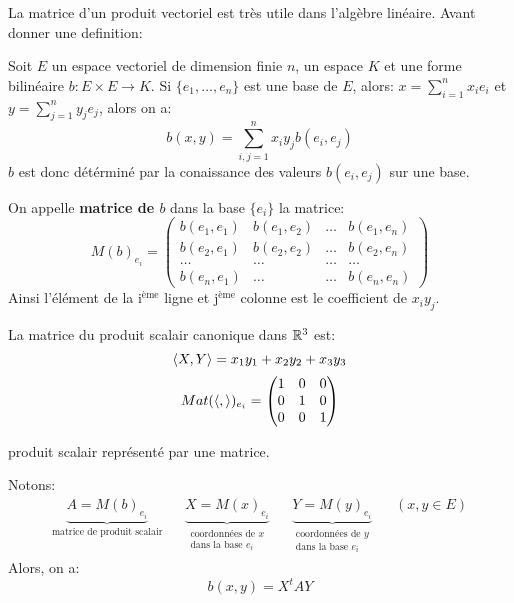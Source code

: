 La matrice d'un produit vectoriel est très utile dans l'algèbre linéaire. Avant donner une definition:
\par
Soit $E$ un espace vectoriel de dimension finie  $n$, un espace  $K$ et une forme bilinéaire  $b: E \times E \longrightarrow K$. Si $\{e_1, \ldots, e_n\}$ est une base de $E$, alors:  $x = \sum_{i=1}^{n} x_ie_i$ et $y = \sum_{j=1}^{n} y_je_j$, alors on a:
\[
b(x, y) = \sum_{i,j = 1}^{n} x_iy_jb(e_i, e_j)
\] 
$b$ est donc détérminé par la conaissance des valeurs  $b(e_i, e_j)$ sur une base.
 \begin{definition}
     On appelle  \textbf{matrice de $b$} dans la base $\{e_i\}$ la matrice:
      \[
          M(b)_{e_i} = \begin{pmatrix} 
              b(e_1, e_1) & b(e_1, e_2) & \ldots & b(e_1, e_n)\\
              b(e_2, e_1) & b(e_2, e_2) & \ldots & b(e_2, e_n)\\
              \ldots & \ldots & \ldots & \ldots\\
              b(e_n, e_1) & \ldots & \ldots & b(e_n, e_n)
          \end{pmatrix} 
     \] 
     Ainsi l'élément de la $\text{i}^{\text{ème}}$ ligne et $\text{j}^{\text{ème}}$ colonne est le coefficient de $x_iy_j$.
\end{definition}
\begin{eg}
   La matrice du produit scalair canonique dans $\mathbb{R}^3$ est:
   \[
       \left\langle X, Y \right\rangle = x_1y_1 + x_2y_2 + x_3y_3 
   \] 
   \[
       Mat(\left\langle , \right\rangle)_{e_i} = \begin{pmatrix} 
            1 & 0 & 0\\
            0 & 1 & 0\\
            0 & 0 & 1
       \end{pmatrix} 
   \] 
\end{eg}
\begin{prop}\label{prop:prod-scal-par-matrice} produit scalair représenté par une matrice.\par
   Notons:
   \begin{align*}
       \underbrace{A = M(b)_{e_i}}_{\text{matrice de produit scalair}} && \underbrace{X = M(x)_{e_i}}_{\substack{\text{coordonnées de $x$}\\ \text{dans la base  $e_i$}}} && \underbrace{Y = M(y)_{e_i}}_{\substack{\text{coordonnées de $y$}\\ \text{dans la base $e_i$}}} && (x, y \in E)
   \end{align*}
   Alors, on a:
   \[
       b(x, y) = X^{t}AY
   \] 
\end{prop}
